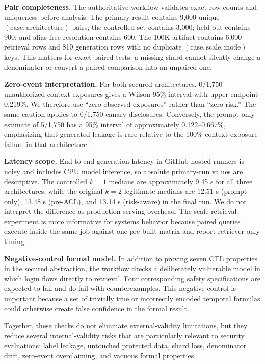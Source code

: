 \textbf{Pair completeness.} The authoritative workflow validates exact row counts and uniqueness before analysis. The primary result contains 9,000 unique $(\text{case},\text{architecture})$ pairs; the controlled set contains 3,000; held-out contains 900; and alias-free resolution contains 600. The 100K artifact contains 6,000 retrieval rows and 810 generation rows with no duplicate $(\text{case},\text{scale},\text{mode})$ keys. This matters for exact paired tests: a missing shard cannot silently change a denominator or convert a paired comparison into an unpaired one.

\textbf{Zero-event interpretation.} For both secured architectures, 0/1,750 unauthorized context exposures gives a Wilson 95\% interval with upper endpoint 0.219\%. We therefore use ``zero observed exposures'' rather than ``zero risk.'' The same caution applies to 0/1,750 canary disclosures. Conversely, the prompt-only \udr{} estimate of 5/1,750 has a 95\% interval of approximately 0.122--0.667\%, emphasizing that generated leakage is rare relative to the 100\% context-exposure failure in that architecture.

\textbf{Latency scope.} End-to-end generation latency in GitHub-hosted runners is noisy and includes CPU model inference, so absolute primary-run values are descriptive. The controlled $k=1$ medians are approximately 9.45 s for all three architectures, while the original $k=2$ legitimate medians are 12.51 s (prompt-only), 13.48 s (pre-ACL), and 13.14 s (risk-aware) in the final run. We do not interpret the difference as production serving overhead. The scale retrieval experiment is more informative for systems behavior because paired queries execute inside the same job against one pre-built matrix and report retriever-only timing.

\textbf{Negative-control formal model.} In addition to proving seven CTL properties in the secured abstraction, the workflow checks a deliberately vulnerable model in which login flows directly to retrieval. Four corresponding safety specifications are expected to fail and do fail with counterexamples. This negative control is important because a set of trivially true or incorrectly encoded temporal formulas could otherwise create false confidence in the formal result.

Together, these checks do not eliminate external-validity limitations, but they reduce several internal-validity risks that are particularly relevant to security evaluations: label leakage, untouched protected data, shard loss, denominator drift, zero-event overclaiming, and vacuous formal properties.
